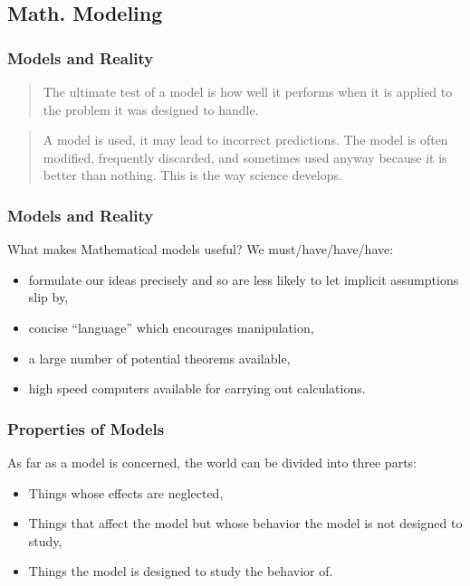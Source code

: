 \documentclass[hyperref={colorlinks=false},compress,handout,10pt]{beamer}
\let\olditem\item
\renewcommand{\item}{\setlength{\itemsep}{0.5\baselineskip}\olditem}
\begin{document}
\subsection{Math. Modeling}


\begin{frame}
    \frametitle{Models and Reality}
    \begin{verse}
        The ultimate test of a model is how well it performs when 
        it is applied to the problem it was designed to handle.
    \end{verse}
    \vskip0.5in
    \begin{verse}
       A model is used, it may lead to incorrect predictions. The model is
       often modified, frequently discarded, and sometimes used anyway because
       it is better than nothing. This is the way science develops.  
    \end{verse}
\end{frame}

\begin{frame}
    \frametitle{Models and Reality}
    What makes Mathematical models useful? We must/have/have/have:
    \vskip0.1in
    \begin{itemize}
        \item formulate our ideas precisely and so are less likely to let implicit assumptions slip by,
        \item concise ``language'' which encourages manipulation,
        \item a large number of potential theorems available,
        \item high speed computers available for carrying out calculations.
    \end{itemize}
\end{frame}

\begin{frame}
    \frametitle{Properties of Models}
    As far as a model is concerned, the world can be divided into three parts:
    \vskip0.1in
    \begin{itemize}
        \item Things whose effects are neglected,
        \item Things that affect the model but whose behavior the model is not
            designed to study,
        \item Things the model is designed to study the behavior of. 
    \end{itemize}
\end{frame}
   
\end{document}
